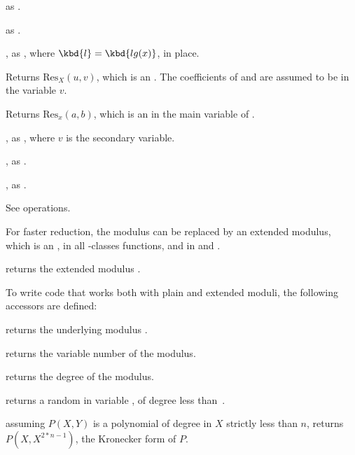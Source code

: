 as .

 as .

, as , where
$\kbd{l} = \kbd{lg(x)}$, in place.

 Returns
$\text{Res}_X(u, v)$, which is an . The coefficients of 
and  are assumed to be in the variable $v$.

Returns $\text{Res}_x(a, b)$, which is an 
in the main variable of .

, as ,
where $v$ is the secondary variable.

, as .

, as
.

 See  operations.


For faster reduction, the modulus  can be replaced by an extended
modulus, which is an , in all -classes
functions, and in  and .

 returns the extended modulus
.

To write code that works both with plain and extended moduli, the following
accessors are defined:

 returns the underlying modulus .

 returns the variable number of the modulus.

 returns the degree of the modulus.


 returns a random
 in variable , of degree less than~.

 assuming $P(X,Y)$ is a polynomial
of degree in $X$ strictly less than $n$, returns $P(X,X^{2*n-1})$, the
Kronecker form of $P$.

